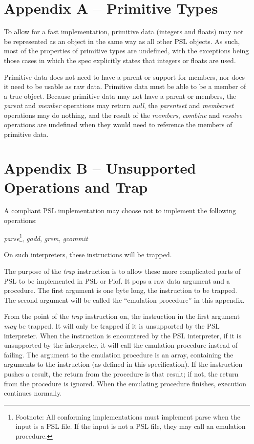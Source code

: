 \chapter{Appendix A -- Primitive Types}

To allow for a fast implementation, primitive data (integers and floats) may not be represented as an object in the same way as all other PSL objects. As such, most of the properties of primitive types are undefined, with the exceptions being those cases in which the spec explicitly states that integers or floats are used.

Primitive data does not need to have a parent or support for members, nor does it need to be usable as raw data. Primitive data must be able to be a member of a true object. Because primitive data may not have a parent or members, the \textit{parent} and \textit{member} operations may return \textit{null}, the \textit{parentset} and \textit{memberset} operations may do nothing, and the result of the \textit{members}, \textit{combine} and \textit{resolve} operations are undefined when they would need to reference the members of primitive data.



\chapter{Appendix B -- Unsupported Operations and Trap}

A compliant PSL implementation may choose not to implement the following operations:

\textit{parse}\footnote{Footnote: All conforming implementations must implement parse when the input is a PSL file. If the input is not a PSL file, they may call an emulation procedure.}, \textit{gadd}, \textit{grem}, \textit{gcommit}

On such interpreters, these instructions will be trapped.

The purpose of the \textit{trap} instruction is to allow these more complicated parts of PSL to be implemented in PSL or Plof. It pops a raw data argument and a procedure. The first argument is one byte long, the instruction to be trapped. The second argument will be called the “emulation procedure” in this appendix.

From the point of the \textit{trap} instruction on, the instruction in the first argument \textit{may} be trapped. It will only be trapped if it is unsupported by the PSL interpreter. When the instruction is encountered by the PSL interpreter, if it is unsupported by the interpreter, it will call the emulation procedure instead of failing. The argument to the emulation procedure is an array, containing the arguments to the instruction (as defined in this specification). If the instruction pushes a result, the return from the procedure is that result; if not, the return from the procedure is ignored. When the emulating procedure finishes, execution continues normally.

